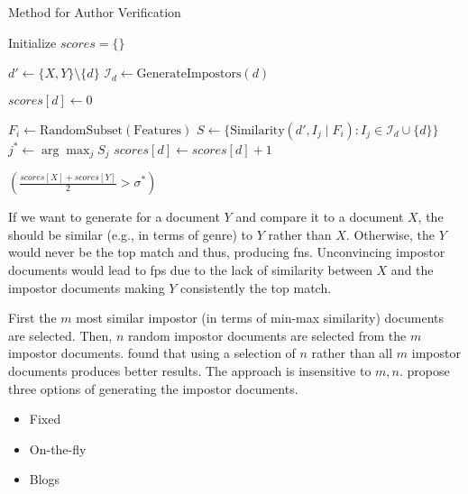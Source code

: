 \begin{algorithm}
    \caption{\imps{} Method for Author Verification}
    \label{alg:impostor_algo}
    \begin{algorithmic}[1]
    
        \State Initialize $scores = \{\}$ 
    
            \State $d' \gets \{X, Y\} \setminus \{d\}$ 
            \State $\mathcal{I}_d \gets \text{GenerateImpostors}(d)$ 
    
            \State $scores[d] \gets 0$ 
    
                \State $F_i \gets \text{RandomSubset}(\text{Features})$ 
                \State $S \gets \{ \text{Similarity}(d', I_j \mid F_i) : I_j \in \mathcal{I}_d \cup \{d\} \}$ 
                \State $j^* \gets \arg\max_j S_j$ 
                 
                    \State $scores[d] \gets scores[d] + 1$ 

                \EndIf
            \EndFor
        \EndFor
    
        \State \Return $\left( \frac{scores[X] + scores[Y]}{2} > \sigma^* \right)$ 
    \EndProcedure
    \end{algorithmic}
    \end{algorithm}
    
If we want to generate \imps{} for a document $Y$ and compare it to a document $X$, 
the \imps{} should be similar (e.g., in terms of genre) to $Y$ rather than $X$.
Otherwise, the $Y$ would never be the top match and thus, producing \acp{fn}.
Unconvincing impostor documents would lead to \acp{fp} due to the lack of similarity between $X$ and the impostor documents making $Y$ consistently the top match.

First the $m$ most similar impostor (in terms of min-max similarity) documents are selected.
Then, $n$ random impostor documents are selected from the $m$ impostor documents.
\citet{koppel_determining_2014} found that using a selection of $n$ \imps{} rather than all $m$ impostor documents produces better results.
The approach is insensitive to $m,n$.
\citet{koppel_determining_2014} propose three options of generating the impostor documents.
\begin{itemize}
    \item Fixed
    \item On-the-fly
    \item Blogs
\end{itemize}

